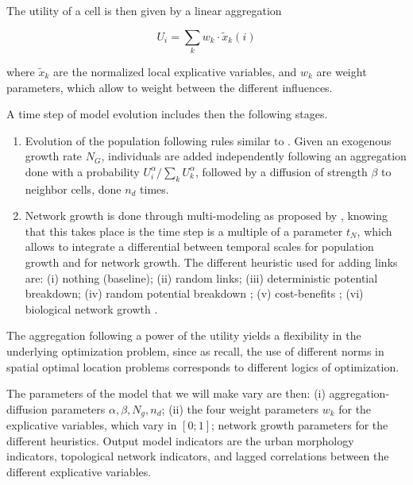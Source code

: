 \documentclass[11pt]{article}
\begin{document}
The utility of a cell is then given by a linear aggregation

\begin{equation}
U_i = \sum_k w_k \cdot \tilde{x}_k(i)
\end{equation}

where $\tilde{x}_k$ are the normalized local explicative variables, and $w_k$ are weight parameters, which allow to weight between the different influences.


A time step of model evolution includes then the following stages.
\begin{enumerate}
	\item Evolution of the population following rules similar to \cite{2017arXiv170806743R}. Given an exogenous growth rate $N_G$, individuals are added independently following an aggregation done with a probability $U_i^\alpha/\sum_k U_k^\alpha$, followed by a diffusion of strength $\beta$ to neighbor cells, done $n_d$ times.
	\item Network growth is done through multi-modeling as proposed by \cite{raimbault2017modeling}, knowing that this takes place is the time step is a multiple of a parameter $t_N$, which allows to integrate a differential between temporal scales for population growth and for network growth. The different heuristic used for adding links are: (i) nothing (baseline); (ii) random links; (iii) deterministic potential breakdown; (iv) random potential breakdown \citep{schmitt2014modelisation}; (v) cost-benefits \citep{louf2013emergence}; (vi) biological network growth \citep{tero2010rules}.
\end{enumerate}



The aggregation following a power of the utility yields a flexibility in the underlying optimization problem, since as \cite{josselin2013revisiting} recall, the use of different norms in spatial optimal location problems corresponds to different logics of optimization.



The parameters of the model that we will make vary are then: (i) aggregation-diffusion parameters $\alpha,\beta,N_g,n_d$; (ii) the four weight parameters $w_k$ for the explicative variables, which vary in $[0;1]$; network growth parameters for the different heuristics. Output model indicators are the urban morphology indicators, topological network indicators, and lagged correlations between the different explicative variables.
\end{document}
